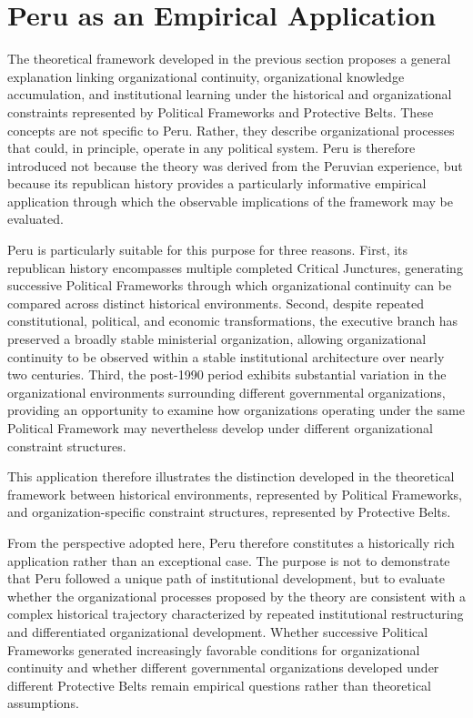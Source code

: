 \documentclass[doc, 12pt, a4paper,floatsintext]{apa7}
\begin{document}
%
\section{Peru as an Empirical Application}\label{sec:peru_case}

The theoretical framework developed in the previous section proposes a general explanation linking organizational continuity, organizational knowledge accumulation, and institutional learning under the historical and organizational constraints represented by Political Frameworks and Protective Belts. These concepts are not specific to Peru. Rather, they describe organizational processes that could, in principle, operate in any political system. Peru is therefore introduced not because the theory was derived from the Peruvian experience, but because its republican history provides a particularly informative empirical application through which the observable implications of the framework may be evaluated.


Peru is particularly suitable for this purpose for three reasons. First, its republican history encompasses multiple completed Critical Junctures, generating successive Political Frameworks through which organizational continuity can be compared across distinct historical environments. Second, despite repeated constitutional, political, and economic transformations, the executive branch has preserved a broadly stable ministerial organization, allowing organizational continuity to be observed within a stable institutional architecture over nearly two centuries. Third, the post-1990 period exhibits substantial variation in the organizational environments surrounding different governmental organizations, providing an opportunity to examine how organizations operating under the same Political Framework may nevertheless develop under different organizational constraint structures.

This application therefore illustrates the distinction developed in the theoretical framework between historical environments, represented by Political Frameworks, and organization-specific constraint structures, represented by Protective Belts.

From the perspective adopted here, Peru therefore constitutes a historically rich application rather than an exceptional case. The purpose is not to demonstrate that Peru followed a unique path of institutional development, but to evaluate whether the organizational processes proposed by the theory are consistent with a complex historical trajectory characterized by repeated institutional restructuring and differentiated organizational development. Whether successive Political Frameworks generated increasingly favorable conditions for organizational continuity and whether different governmental organizations developed under different Protective Belts remain empirical questions rather than theoretical assumptions.
\end{document}
